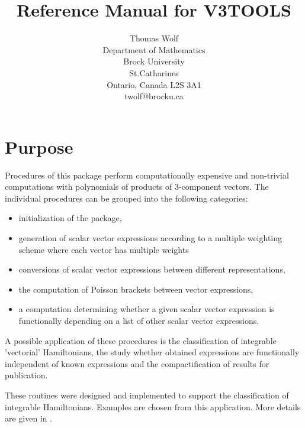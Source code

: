 \documentclass[12pt]{article}
\title{Reference Manual for V3TOOLS}
\author{Thomas Wolf \\                        
        Department of Mathematics \\
        Brock University \\
        St.Catharines \\
        Ontario, Canada L2S 3A1 \\
        twolf@brocku.ca}
\begin{document}
\maketitle

\section{Purpose}
Procedures of this package perform computationally expensive and
non-trivial computations with polynomials of products of 3-component vectors. 
The individual procedures can be grouped into the following categories: 
\begin{itemize}
\item initialization of the package,
\item generation of scalar vector expressions according to a multiple
      weighting scheme where each vector has multiple weights
\item conversions of scalar vector expressions between different
      representations, 
\item the computation of Poisson brackets between vector expressions,
\item a computation determining whether a given scalar vector expression 
      is functionally depending on a list of other scalar vector expressions.
\end{itemize}
A possible application of these procedures is the classification of
integrable 'vectorial' Hamiltonians, the study whether obtained
expressions are functionally independent of known expressions and 
the compactification of results for publication.

These routines were designed and implemented to support the classification
of integrable Hamiltonians. Examples are chosen from this application.
More details are given in \cite{SoWo04}.
\end{document}
